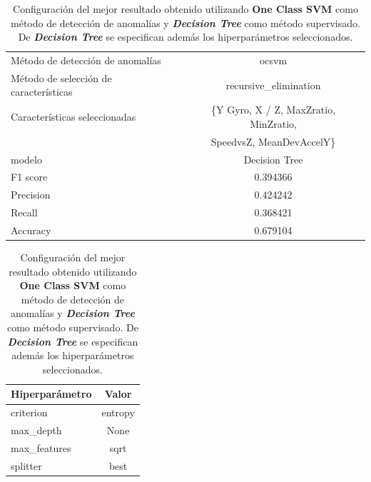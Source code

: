 \begin{appendices}
		\begin{table}[htb]
			\centering
			\caption{Configuración del mejor resultado obtenido utilizando \textbf{One Class SVM} como método de detección de anomalías y \textbf{\emph{Decision Tree}}
			como método supervisado. De \textbf{\emph{Decision Tree}} se especifican además los hiperparámetros seleccionados.}
			\label{table:24}
			\begin{tabular}{lc}
				\toprule
					  Método de detección de anomalías &                                              ocsvm \\
				Método de selección de características &                              recursive\_elimination \\
						 Características seleccionadas & \{Y Gyro, X / Z, MaxZratio, MinZratio, \\
						 							   &   SpeedvsZ,  MeanDevAccelY\}\\
												modelo &                                      Decision Tree \\
											  F1 score &                                           0.394366 \\
											 Precision &                                           0.424242 \\
												Recall &                                           0.368421 \\
											  Accuracy &                                           0.679104 \\
				\bottomrule
			\end{tabular}
			\newline
			\newline

			\begin{tabular}{lc}
				\toprule
				Hiperparámetro &   Valor \\
				\midrule
					 criterion & entropy \\
					 max\_depth &    None \\
				  max\_features &    sqrt \\
					  splitter &    best \\
				\bottomrule
			\end{tabular}
			
		\end{table}


\end{appendices}

